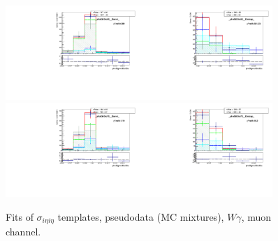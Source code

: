 \begin{figure}[htb]
\begin{center}
   \includegraphics[width=0.45\textwidth]{../figs/figs_v11/MUON_WGamma/TemplateFits/c_TEMPL_SIHIH_UNblind__phoEt55to65__Barrel__RooFit_MCclosure.pdf}\includegraphics[width=0.45\textwidth]{../figs/figs_v11/MUON_WGamma/TemplateFits/c_TEMPL_SIHIH_UNblind__phoEt55to65__Endcap__RooFit_MCclosure.pdf}\\
   \includegraphics[width=0.45\textwidth]{../figs/figs_v11/MUON_WGamma/TemplateFits/c_TEMPL_SIHIH_UNblind__phoEt65to75__Barrel__RooFit_MCclosure.pdf}\includegraphics[width=0.45\textwidth]{../figs/figs_v11/MUON_WGamma/TemplateFits/c_TEMPL_SIHIH_UNblind__phoEt65to75__Endcap__RooFit_MCclosure.pdf}\\
  \label{fig:templateFits_MCclosure_SIHIH_MUON_2}
  \caption{Fits of $\sigma_{i \eta i \eta}$ templates, pseudodata (MC mixtures), $W\gamma$, muon channel.}
  \end{center}
\end{figure}

